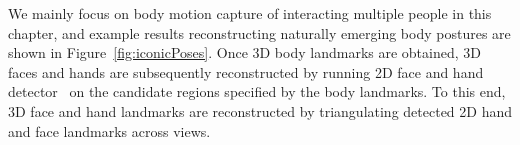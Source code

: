We mainly focus on body motion capture of interacting multiple people in this chapter, and example results reconstructing naturally emerging body postures are shown in Figure~\ref{fig:iconicPoses}. Once 3D body landmarks are obtained, 3D faces and hands are subsequently reconstructed by running 2D face and hand detector~\cite{Tomas-17} on the candidate regions specified by the body landmarks. To this end, 3D face and hand landmarks are reconstructed by triangulating detected 2D hand and face landmarks across views. 


